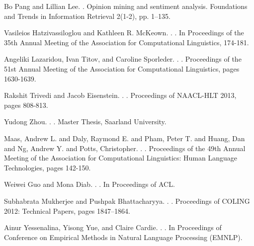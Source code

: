 \documentclass[11pt,letterpaper]{article}
\begin{document}
\begin{thebibliography}{}

Bo Pang and Lillian Lee.
.
\newblock Opinion mining and sentiment analysis.
\newblock Foundations and Trends in Information Retrieval 2(1-2), pp. 1–135.

Vasileios Hatzivassiloglou and Kathleen R. McKeown. 
.
. 
 In Proceedings of the 35th Annual Meeting of the Association for Computational Linguistics, 174-181.

Angeliki Lazaridou, Ivan Titov, and Caroline Sporleder.
.
.
\newblock Proceedings of the 51st Annual Meeting of the Association for Computational Linguistics, pages 1630-1639.

Rakshit Trivedi and Jacob Eisenstein.
.
.
\newblock Proceedings of NAACL-HLT 2013, pages 808-813.

Yudong Zhou.
.
.
\newblock Master Thesis, Saarland University.

Maas, Andrew L.  and  Daly, Raymond E.  and  Pham, Peter T.  and  Huang, Dan  and  Ng, Andrew Y.  and  Potts, Christopher.
.
.
\newblock Proceedings of the 49th Annual Meeting of the Association for Computational Linguistics: Human Language Technologies, pages 142-150.

Weiwei Guo and Mona Diab.
.
.
\newblock  In Proceedings of ACL.

Subhabrata Mukherjee and Pushpak Bhattacharyya.
.
.
\newblock Proceedings of COLING 2012: Technical Papers, pages 1847–1864.

Ainur Yessenalina, Yisong Yue, and Claire Cardie.
.
. 
\newblock In Proceedings of Conference on Empirical Methods in Natural Language Processing (EMNLP).


\end{thebibliography}
\end{document}
